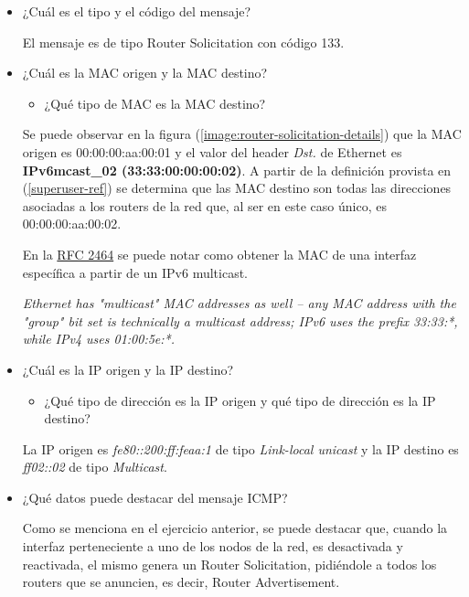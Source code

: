\documentclass[osajnl,twocolumn,showpacs,superscriptaddress,10pt]{revtex4-1} %
\begin{document}
\begin{itemize}
    \item ¿Cuál es el tipo y el código del mensaje?
    
    El mensaje es de tipo Router Solicitation con código 133.

    \item ¿Cuál es la MAC origen y la MAC destino?
    
    \begin{itemize}
        \item ¿Qué tipo de MAC es la MAC destino?
    \end{itemize}

    Se puede observar en la figura (\ref{image:router-solicitation-details}) que la MAC origen es 00:00:00:aa:00:01 y el valor del header \textit{Dst.} de Ethernet
    es \textbf{IPv6mcast\_02 (33:33:00:00:00:02)}. A partir de la definición provista en (\ref{superuser-ref}) se determina que
    las MAC destino son todas las direcciones asociadas a los routers de la red que, al ser en este caso único, es 00:00:00:aa:00:02.
    
    En la \href{https://tools.ietf.org/html/rfc2464#section-7}{RFC 2464} se puede notar como obtener la MAC de una interfaz
    específica a partir de un IPv6 multicast.
    
    \textit{Ethernet has "multicast" MAC addresses as well – any MAC address with the "group" bit set is technically a multicast address; IPv6 uses the prefix 33:33:*, while IPv4 uses 01:00:5e:*.}
    \label{superuser-ref}

    \item ¿Cuál es la IP origen y la IP destino?
    
    \begin{itemize}
        \item ¿Qué tipo de dirección es la IP origen y qué tipo de dirección es la IP destino?
    \end{itemize}

    La IP origen es \textit{fe80::200:ff:feaa:1} de tipo \textit{Link-local unicast} y la IP destino es \textit{ff02::02} de tipo \textit{Multicast}.

    \item ¿Qué datos puede destacar del mensaje ICMP?
    
    Como se menciona en el ejercicio anterior, se puede destacar que, cuando la interfaz perteneciente a uno de los nodos de la red, es desactivada y reactivada, el mismo genera un Router Solicitation, pidiéndole a todos los routers que se anuncien, es decir, Router Advertisement.
\end{itemize}
\end{document}
